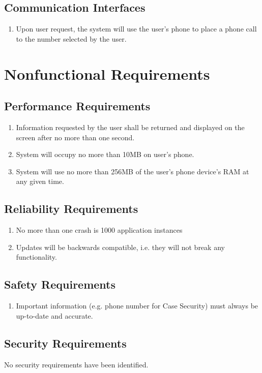 \documentclass[pdftex,12pt,letter]{article}
\begin{document}
\subsection{Communication Interfaces}
\begin{enumerate}[CI-1]
\item Upon user request, the system will use the user's phone to place a phone call to the number selected by the user.
\end{enumerate}
\section{Nonfunctional Requirements}
\subsection{Performance Requirements}
\begin{enumerate}[PR-1:]
\item Information requested by the user shall be returned and displayed on the screen after no more than one second.
\item System will occupy no more than 10MB on user's phone.
\item System will use no more than 256MB of the user's phone device's RAM at any given time.
\end{enumerate}
\subsection{Reliability Requirements}
\begin{enumerate}[RR-1:]
\item No more than one crash is 1000 application instances
\item Updates will be backwards compatible, i.e. they will not break any functionality.
\end{enumerate}
\subsection{Safety Requirements}
\begin{enumerate}[SR-1:]
\item Important information (e.g. phone number for Case Security) must always be up-to-date and accurate.
\end{enumerate}
\subsection{Security Requirements}
No security requirements have been identified.

\end{document}

